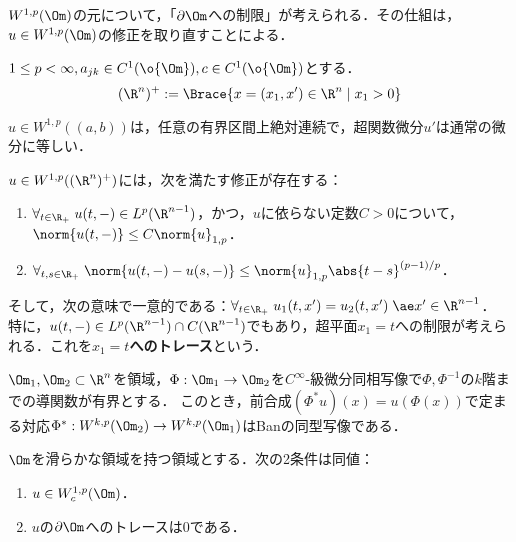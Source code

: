 \documentclass[uplatex, dvipdfmx]{jsreport}
\begin{document}
\begin{tcolorbox}[colframe=ForestGreen, colback=ForestGreen!10!white,breakable,colbacktitle=ForestGreen!40!white,coltitle=black,fonttitle=\bfseries\sffamily,
title=]
    $W^{1,p}(\Om)$の元について，「$\partial\Om$への制限」が考えられる．その仕組は，$u\in W^{1,p}(\Om)$の修正を取り直すことによる．
\end{tcolorbox}

\begin{notation}
    $1\le p<\infty,a_{jk}\in C^1(\o{\Om}),c\in C^1(\o{\Om})$とする．
    \[(\R^n)^+:=\Brace{x=(x_1,x')\in\R^n\mid x_1>0}\]
\end{notation}

\begin{theorem}
    $u\in W^{1,p}((a,b))$は，任意の有界区間上絶対連続で，超関数微分$u'$は通常の微分に等しい．
\end{theorem}

\begin{theorem}[連続変形定理]
    $u\in W^{1,p}((\R^n)^+)$には，次を満たす修正が存在する：
    \begin{enumerate}
        \item $\forall_{t\in\R_+}\;u(t,-)\in L^p(\R^{n-1})$，かつ，$u$に依らない定数$C>0$について，$\norm{u(t,-)}\le C\norm{u}_{1,p}$．
        \item $\forall_{t,s\in\R_+}\;\norm{u(t,-)-u(s,-)}\le\norm{u}_{1,p}\abs{t-s}^{(p-1)/p}$．
    \end{enumerate}
    そして，次の意味で一意的である：$\forall_{t\in\R_+}\;u_1(t,x')=u_2(t,x')\;\ae x'\in\R^{n-1}$．
    特に，$u(t,-)\in L^p(\R^{n-1})\cap C(\R^{n-1})$でもあり，超平面$x_1=t$への制限が考えられる．これを\textbf{$x_1=t$へのトレース}という．
\end{theorem}

\begin{theorem}[座標変換不変性]
    $\Om_1,\Om_2\subset\R^n$を領域，$\Phi:\Om_1\to\Om_2$を$C^\infty$-級微分同相写像で$\Phi,\Phi^{-1}$の$k$階までの導関数が有界とする．
    このとき，前合成$(\Phi^*u)(x)=u(\Phi(x))$で定まる対応$\Phi^*:W^{k,p}(\Om_2)\to W^{k,p}(\Om_1)$はBanの同型写像である．
\end{theorem}

\begin{theorem}
    $\Om$を滑らかな領域を持つ領域とする．次の2条件は同値：
    \begin{enumerate}
        \item $u\in W^{1,p}_c(\Om)$．
        \item $u$の$\partial\Om$へのトレースは$0$である．
    \end{enumerate}
\end{theorem}
\end{document}
